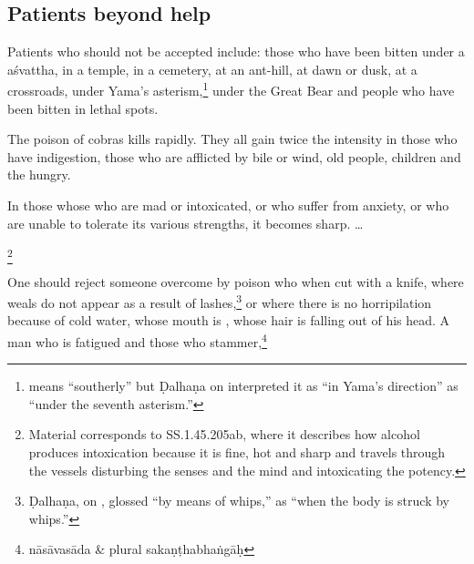 \begin{translation}[resume]
 \subsection{Patients beyond help}  
 
 \item[38] 

Patients who should not be accepted include: those who have been
bitten under a \gls{aśvattha}, in a temple, in a cemetery, at an
ant-hill, at dawn or dusk, at a crossroads, under Yama's
asterism,\footnote{ means “southerly” but Ḍalhaṇa on
     interpreted it as “in
    Yama's direction” as “under the seventh asterism.”} under the Great
    Bear and people who have been bitten in lethal spots.
 
 \item[39]  
 
The poison of cobras kills rapidly.  They all gain twice the intensity
in those who have indigestion, those who are afflicted by bile or
wind, old people, children and the hungry.
 
 
 \item[39.1]  
 
In those whose who are mad or intoxicated, or who suffer from anxiety,
or who are unable to tolerate its various strengths, it becomes sharp.
\dag \ldots
 
 \item[39.2] 
 
 
 
 \footnote{Material corresponds to SS.1.45.205ab, where it  
 describes how alcohol produces intoxication because it is fine, hot  
 and sharp and travels through the vessels disturbing the senses and  
 the mind and intoxicating the potency.}  
 
 \item [3.40cd--3.41]  
 
One should reject someone overcome by poison who  
when cut with a knife, where weals do not appear as a result of  
 lashes,\footnote{Ḍalhaṇa, on , glossed  
“by means of whips,” as “when the body is struck by whips.”} or where 
there is no horripilation because of cold water, whose mouth is 
, whose hair is falling out of his head.  A man who is 
fatigued and those who stammer,\footnote{nāsāvasāda \& plural 
sakaṇṭhabhaṅgāḥ}  
 
 \item[3.42]  
 

\end{translation}
